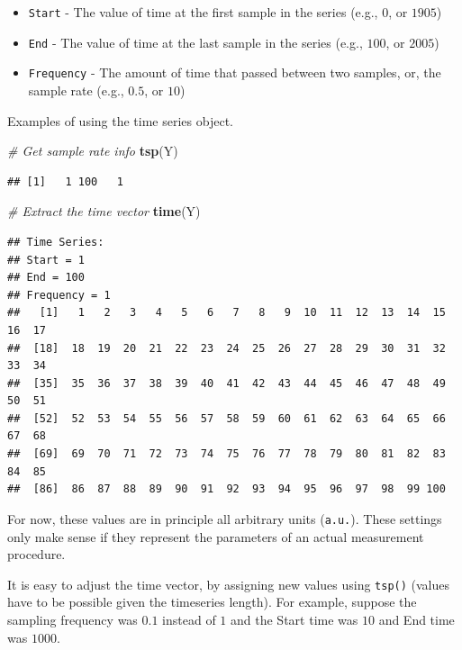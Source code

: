\documentclass[]{book}
\newenvironment{Shaded}{\begin{snugshade}}{\end{snugshade}}
\newcommand{\KeywordTok}[1]{\textcolor[rgb]{0.13,0.29,0.53}{\textbf{{#1}}}}
\newcommand{\CommentTok}[1]{\textcolor[rgb]{0.56,0.35,0.01}{\textit{{#1}}}}
\newcommand{\NormalTok}[1]{{#1}}
\providecommand{\tightlist}{%
  \setlength{\itemsep}{0pt}\setlength{\parskip}{0pt}}
\begin{document}
\begin{itemize}
\tightlist
\item
  \texttt{Start} - The value of time at the first sample in the series
  (e.g., \(0\), or \(1905\))
\item
  \texttt{End} - The value of time at the last sample in the series
  (e.g., \(100\), or \(2005\))
\item
  \texttt{Frequency} - The amount of time that passed between two
  samples, or, the sample rate (e.g., \(0.5\), or \(10\))
\end{itemize}

Examples of using the time series object.

\begin{Shaded}
\begin{Highlighting}[]
\CommentTok{# Get sample rate info}
\KeywordTok{tsp}\NormalTok{(Y)}
\end{Highlighting}
\end{Shaded}

\begin{verbatim}
## [1]   1 100   1
\end{verbatim}

\begin{Shaded}
\begin{Highlighting}[]
\CommentTok{# Extract the time vector}
\KeywordTok{time}\NormalTok{(Y)}
\end{Highlighting}
\end{Shaded}

\begin{verbatim}
## Time Series:
## Start = 1 
## End = 100 
## Frequency = 1 
##   [1]   1   2   3   4   5   6   7   8   9  10  11  12  13  14  15  16  17
##  [18]  18  19  20  21  22  23  24  25  26  27  28  29  30  31  32  33  34
##  [35]  35  36  37  38  39  40  41  42  43  44  45  46  47  48  49  50  51
##  [52]  52  53  54  55  56  57  58  59  60  61  62  63  64  65  66  67  68
##  [69]  69  70  71  72  73  74  75  76  77  78  79  80  81  82  83  84  85
##  [86]  86  87  88  89  90  91  92  93  94  95  96  97  98  99 100
\end{verbatim}

For now, these values are in principle all arbitrary units
(\texttt{a.u.}). These settings only make sense if they represent the
parameters of an actual measurement procedure.

It is easy to adjust the time vector, by assigning new values using
\texttt{tsp()} (values have to be possible given the timeseries length).
For example, suppose the sampling frequency was \(0.1\) instead of \(1\)
and the Start time was \(10\) and End time was \(1000\).
\end{document}
